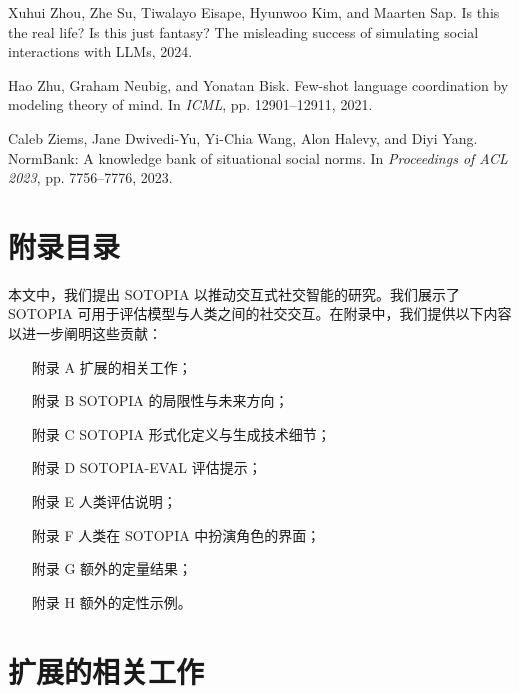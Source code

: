 \documentclass[11pt,a4paper]{article}
\begin{document}
\begin{thebibliography}{99}
Xuhui Zhou, Zhe Su, Tiwalayo Eisape, Hyunwoo Kim, and Maarten Sap. Is this the real life? Is this just fantasy? The misleading success of simulating social interactions with LLMs, 2024.

Hao Zhu, Graham Neubig, and Yonatan Bisk. Few-shot language coordination by modeling theory of mind. In \textit{ICML}, pp. 12901--12911, 2021.

Caleb Ziems, Jane Dwivedi-Yu, Yi-Chia Wang, Alon Halevy, and Diyi Yang. NormBank: A knowledge bank of situational social norms. In \textit{Proceedings of ACL 2023}, pp. 7756--7776, 2023.

\end{thebibliography}

\appendix

\section{附录目录}

本文中，我们提出 SOTOPIA 以推动交互式社交智能的研究。我们展示了 SOTOPIA 可用于评估模型与人类之间的社交交互。在附录中，我们提供以下内容以进一步阐明这些贡献：
\begin{itemize}
    \item[附录 A] 扩展的相关工作；
    \item[附录 B] SOTOPIA 的局限性与未来方向；
    \item[附录 C] SOTOPIA 形式化定义与生成技术细节；
    \item[附录 D] SOTOPIA-EVAL 评估提示；
    \item[附录 E] 人类评估说明；
    \item[附录 F] 人类在 SOTOPIA 中扮演角色的界面；
    \item[附录 G] 额外的定量结果；
    \item[附录 H] 额外的定性示例。
\end{itemize}

\section{扩展的相关工作}
\label{app:related}
\end{document}
